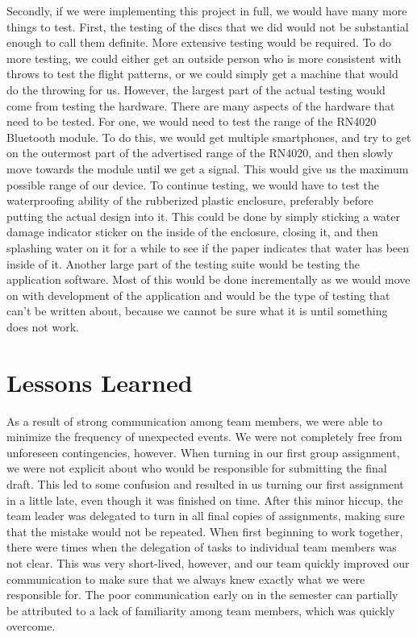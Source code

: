 \documentclass[12pt]{article}
\begin{document}
	Secondly, if we were implementing this project in full, we would have many more things to test. First, the testing of the discs that we did would not be substantial enough to call them definite. More extensive testing would be required. To do more testing, we could either get an outside person who is more consistent with throws to test the flight patterns, or we could simply get a machine that would do the throwing for us. However, the largest part of the actual testing would come from testing the hardware. There are many aspects of the hardware that need to be tested. For one, we would need to test the range of the RN4020 Bluetooth module. To do this, we would get multiple smartphones, and try to get on the outermost part of the advertised range of the RN4020, and then slowly move towards the module until we get a signal. This would give us the maximum possible range of our device. To continue testing, we would have to test the waterproofing ability of the rubberized plastic enclosure, preferably before putting the actual design into it. This could be done by simply sticking a water damage indicator sticker on the inside of the enclosure, closing it, and then splashing water on it for a while to see if the paper indicates that water has been inside of it. Another large part of the testing suite would be testing the application software. Most of this would be done incrementally as we would move on with development of the application and would be the type of testing that can't be written about, because we cannot be sure what it is until something does not work.  
	
	\section{Lessons Learned}
	
	As a result of strong communication among team members, we were able to minimize the frequency of unexpected events. We were not completely free from unforeseen contingencies, however. When turning in our first group assignment, we were not explicit about who would be responsible for submitting the final draft. This led to some confusion and resulted in us turning our first assignment in a little late, even though it was finished on time. After this minor hiccup, the team leader was delegated to turn in all final copies of assignments, making sure that the mistake would not be repeated. 
	When first beginning to work together, there were times when the delegation of tasks to individual team members was not clear. This was very short-lived, however, and our team quickly improved our communication to make sure that we always knew exactly what we were responsible for. The poor communication early on in the semester can partially be attributed to a lack of familiarity among team members, which was quickly overcome. 
\end{document}
